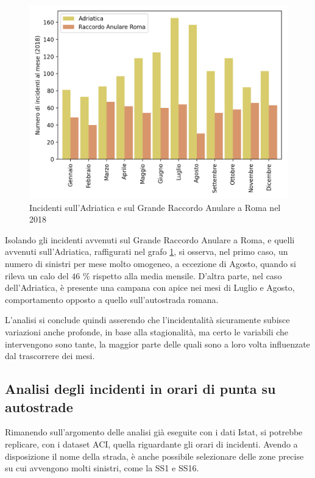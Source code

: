 \documentclass[a4paper,12pt]{report}
\begin{document}
\begin{figure}
    \hfill\includegraphics[width=0.7\linewidth]{../src/incidenti/incidenti_aci/autostrade/adriatica_roma.png}\hspace*{\fill}
    \caption{Incidenti sull'Adriatica e sul Grande Raccordo Anulare a Roma nel 2018}
    \label{fig:adriatica-roma}
\end{figure}

Isolando gli incidenti avvenuti sul Grande Raccordo Anulare a Roma, e quelli avvenuti 
sull'Adriatica, raffigurati nel grafo \ref{fig:adriatica-roma}, si osserva, 
nel primo caso, un numero di sinistri per mese molto omogeneo, a eccezione di 
Agosto, quando si rileva un calo del $46$ \% rispetto alla media mensile. 
D'altra parte, nel caso dell'Adriatica, è presente una campana con apice nei 
mesi di Luglio e Agosto, comportamento opposto a quello sull'autostrada 
romana. 

L'analisi si conclude quindi asserendo che l'incidentalità sicuramente subisce 
variazioni anche profonde, in base alla stagionalità, ma certo le variabili 
che intervengono sono tante, la maggior parte delle quali sono
a loro volta influenzate dal trascorrere dei mesi.

\subsection{Analisi degli incidenti in orari di punta su autostrade}

Rimanendo sull'argomento delle analisi già eseguite con i dati Istat, 
si potrebbe replicare, con i dataset ACI, quella riguardante gli orari di incidenti. 
Avendo a disposizione il nome della strada, è anche possibile selezionare delle zone precise 
su cui avvengono molti sinistri, come la SS1 e SS16. 
\end{document}
